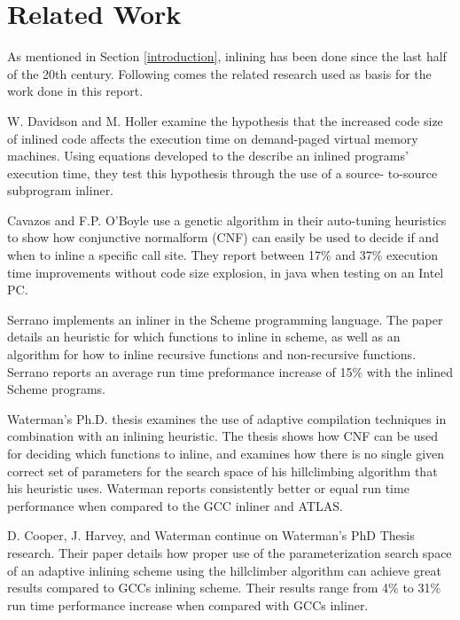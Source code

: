 
\clearpage
\section{Related Work}


As mentioned in Section \ref{introduction}, inlining has been done since the
last half of the 20th century. Following comes the related research used as
basis for the work done in this report.

W. Davidson and M. Holler \cite{SubprogInlining} examine the hypothesis that the
increased code size of inlined code affects the execution time on demand-paged
virtual memory machines. Using equations developed to the describe an inlined
programs' execution time, they test this hypothesis through the use of a source-
to-source subprogram inliner.

Cavazos and F.P. O'Boyle \cite{AutoTuningJavaHeuristics} use a genetic algorithm
in their auto-tuning heuristics to show how conjunctive normalform (CNF) can
easily be used to decide if and when to inline a specific call site. They report
between 17\% and 37\% execution time improvements without code size explosion,
in java when testing on an Intel PC.

Serrano \cite{InlineWhenHowSerrano} implements an inliner in the Scheme
programming language. The paper details an heuristic for which functions to
inline in scheme, as well as an algorithm for how to inline recursive functions
and non-recursive functions. Serrano reports an average run time preformance
increase of 15\% with the inlined Scheme programs.

Waterman's Ph.D. thesis \cite{AdaptvCompilAndInlingWaterman} examines the use of
adaptive compilation techniques in combination with an inlining heuristic. The
thesis shows how CNF can be used for deciding which functions to inline, and
examines how there is no single given correct set of parameters for the search
space of his hillclimbing algorithm that his heuristic uses. Waterman reports
consistently better or equal run time performance when compared to the GCC
inliner and ATLAS.

D. Cooper, J. Harvey, and Waterman \cite{AdaptvStratInlSubst} continue on
Waterman's PhD Thesis \cite{AdaptvCompilAndInlingWaterman} research. Their paper
details how proper use of the parameterization search space of an adaptive
inlining scheme using the hillclimber algorithm can achieve great results
compared to GCCs inlining scheme. Their results range from 4\% to 31\% run time
performance increase when compared with GCCs inliner.

